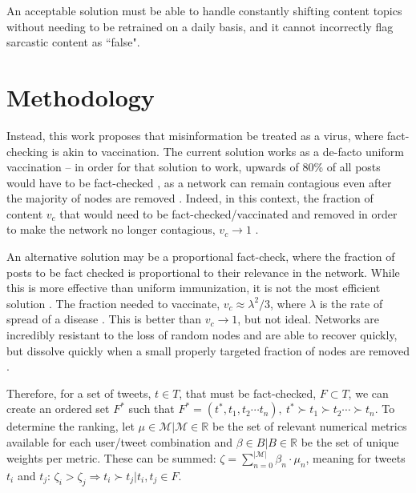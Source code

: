 \documentclass[preprint,12pt]{elsarticle}
\begin{document}
An acceptable solution must be able to handle constantly shifting content topics without needing to be retrained on a daily basis, and it cannot incorrectly flag sarcastic content as ``false".

\section{Methodology}
\label{methodology}
Instead, this work proposes that misinformation be treated as a virus, where fact-checking is akin to vaccination. The current solution works as a de-facto uniform vaccination -- in order for that solution to work, upwards of 80\% of all posts would have to be fact-checked \cite{may1984spatial,hethcote2014gonorrhea,hethcote2013modeling,hethcote1987epidemiological,albert2000error, pastor2001epidemic}, as a network can remain contagious even after the majority of nodes are removed \cite{cohen2000resilience}. Indeed, in this context, the fraction of content $v_c$ that would need to be fact-checked/vaccinated and removed in order to make the network no longer contagious, $v_c \rightarrow 1$ \cite{cohen2003efficient,strogatz2001exploring,albert2002statistical,dorogovtsev2002evolution,pastor2002immunization}. 

An alternative solution may be a proportional fact-check, where the fraction of posts to be fact checked is proportional to their relevance in the network. While this is more effective than uniform immunization, it is not the most efficient solution \cite{dezsHo2002halting,anderson1992infectious}. The fraction needed to vaccinate, $v_c \approx \lambda^2/3 $, where $\lambda$ is the rate of spread of a disease \cite{pastor2002immunization,barabasi1999emergence}. This is better than $v_c \rightarrow 1$, but not ideal. Networks are incredibly resistant to the loss of random nodes and are able to recover quickly, but dissolve quickly when a small properly targeted fraction of nodes are removed  \cite{albert2000error,callaway2000network,cohen2003efficient,helleringer2007sexual,cohen2001breakdown,hethcote2014gonorrhea,cohen2000resilience}.

Therefore, for a set of tweets, $ t \in T$, that must be fact-checked, $F \subset T$, we can create an ordered set $F^*$ such that $F^* = (t^*, t_1, t_2 \cdots t_n), \ t^* \succ t_1 \succ t_2 \cdots \succ t_n$. To determine the ranking, let $\mu \in \mathcal{M} | \mathcal{M} \in \mathbb{R}$ be the set of relevant numerical metrics available for each user/tweet combination and $\beta \in B| B \in \mathbb{R}$ be the set of unique weights per metric. These can be summed: $\zeta = \sum_{n=0}^{|\mathcal{M}|} \beta_{n} \cdot \mu_{n}$, meaning for tweets $t_i$ and $t_j$: $\zeta_i > \zeta_j \Rightarrow t_i \succ t_j | t_i, t_j \in F$.
 
\end{document}
